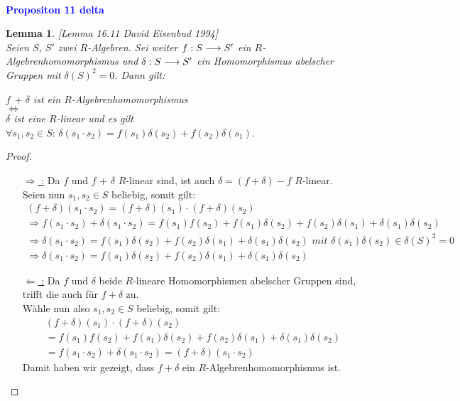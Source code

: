 \documentclass[10pt,a4paper]{report}
\newcommand{\ModulsOfDifferenzials}{David Eisenbud 1994}
\newcounter{Aussage}[chapter]
\newtheorem{lemma}[Aussage]{Lemma}
\newcommand{\functionfront}[3]{\nolinebreak{#1:#2 \longrightarrow #3}}
\begin{document}
\ \\
\textcolor{blue}{\textbf{Propositon 11 delta}}
\begin{lemma}\label{Propositon 11 delta} \textit{[Lemma 16.11 \ModulsOfDifferenzials]} \\
Seien $S$, $S'$ zwei $R$-Algebren. Sei weiter $\functionfront{f}{S}{S'}$ ein $R$-Algebrenhomomorphismus und $\functionfront{\delta}{S}{S'}$ ein Homomorphismus abelscher Gruppen mit $\delta(S)^2 = 0$. Dann gilt:
\begin{center}
$f$ + $\delta$ ist ein $R$-Algebrenhomomorphismus\\
$\Leftrightarrow$\\
$\delta$ ist eine $R$-linear und es gilt $\forall s_1,s_2 \in S :\, \delta(s_1 \cdot s_2) = f(s_1)\delta(s_2) + f(s_2)\delta(s_1)$.
\end{center}
\end{lemma}
\begin{proof} \ \\
\begin{itemize}
\item[\underline{\glqq $\Rightarrow$ \grqq :}] Da $f$ und $f$ + $\delta$ $R$-linear sind, ist auch $\delta = (f + \delta) - f$ $R$-linear.\\
Seien nun $s_1,s_2 \in S$ beliebig, somit gilt:
\begin{gather*}
(f + \delta)(s_1 \cdot s_2) = (f + \delta)(s_1) \cdot (f + \delta)(s_2)\\
\Rightarrow f(s_1 \cdot s_2) + \delta(s_1 \cdot s_2) = f(s_1)f(s_2) + f(s_1)\delta(s_2) + f(s_2)\delta(s_1) + \delta(s_1)\delta(s_2)\\
\Rightarrow \delta(s_1 \cdot s_2) = f(s_1)\delta(s_2) + f(s_2)\delta(s_1) + \delta(s_1)\delta(s_2) \textit{ mit } \delta(s_1)\delta(s_2) \in \delta(S)^2 = 0 \\
\Rightarrow \delta(s_1 \cdot s_2) = f(s_1)\delta(s_2) + f(s_2)\delta(s_1) + \delta(s_1)\delta(s_2)
\end{gather*}
\item[\underline{\glqq $\Leftarrow$ \grqq :}]
Da $f$ und $\delta$ beide $R$-lineare Homomorphismen abelscher Gruppen sind, trifft die auch für $f + \delta$ zu.\\
Wähle nun also $s_1,s_2 \in S$ beliebig, somit gilt:
\begin{gather*}
(f + \delta)(s_1) \cdot (f + \delta)(s_2) \\
= f(s_1)f(s_2) + f(s_1)\delta(s_2) + f(s_2)\delta(s_1) + \delta(s_1)\delta(s_2)\\
= f(s_1 \cdot s_2) + \delta(s_1 \cdot s_2)
= (f + \delta)(s_1 \cdot s_2)
\end{gather*}
Damit haben wir gezeigt, dass $f + \delta$ ein $R$-Algebrenhomomorphismus ist.
\end{itemize}
\end{proof}
\end{document}
